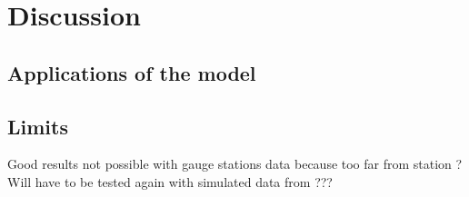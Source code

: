 \chapter{Discussion}

\section{Applications of the model}
\section{Limits}
Good results not possible with gauge stations data because too far from station ? \newline
Will have to be tested again with simulated data from ???
